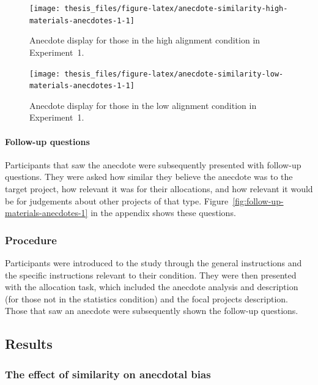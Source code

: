\documentclass[a4paper, nobind, dvipsnames]{templates/ociamthesis}
\theoremstyle{definition}
\theoremstyle{definition}
\theoremstyle{definition}
\theoremstyle{definition}
\theoremstyle{remark}
\begin{document}
\begin{figure}
\texttt{[image: thesis\_files/figure-latex/anecdote-similarity-high-materials-anecdotes-1-1]} \caption{Anecdote display for those in the high alignment condition in Experiment~1.}\label{fig:anecdote-similarity-high-materials-anecdotes-1}
\end{figure}



\begin{figure}
\texttt{[image: thesis\_files/figure-latex/anecdote-similarity-low-materials-anecdotes-1-1]} \caption{Anecdote display for those in the low alignment condition in Experiment~1.}\label{fig:anecdote-similarity-low-materials-anecdotes-1}
\end{figure}

\paragraph{Follow-up questions}

Participants that saw the anecdote were subsequently presented with follow-up
questions. They were asked how similar they believe the anecdote was to the
target project, how relevant it was for their allocations, and how relevant it
would be for judgements about other projects of that type.
Figure~\ref{fig:follow-up-materials-anecdotes-1} in the appendix shows these
questions.

\subsubsection{Procedure}

Participants were introduced to the study through the general instructions and
the specific instructions relevant to their condition. They were then presented
with the allocation task, which included the anecdote analysis and description
(for those not in the statistics condition) and the focal projects description.
Those that saw an anecdote were subsequently shown the follow-up questions.

\hypertarget{results-anecdotes-1}{%
\subsection{Results}\label{results-anecdotes-1}}

\subsubsection{The effect of similarity on anecdotal bias}
\end{document}
